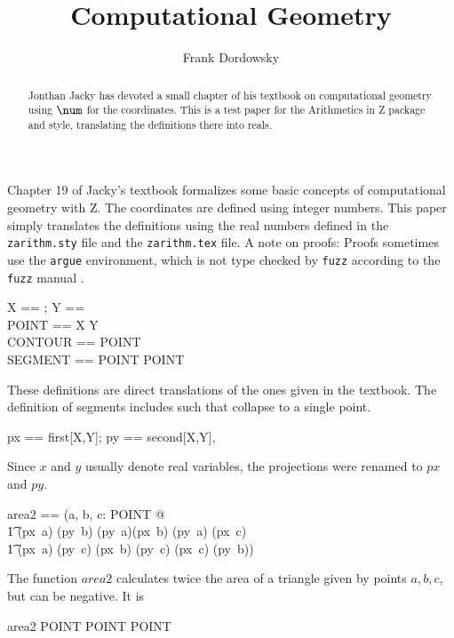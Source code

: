 \documentclass[12pt]{scrartcl}
\begin{document}
\title{Computational Geometry}
\author{Frank Dordowsky}

\maketitle

\begin{abstract}
  Jonthan Jacky has devoted a small chapter of his textbook
  \cite{Jacky1997a} on computational geometry using $\num$ for the
  coordinates. This is a test paper for the Arithmetics in Z package
  and style, translating the definitions there into reals.
\end{abstract}


Chapter 19 of Jacky's textbook \cite{Jacky1997a} formalizes some basic
concepts of computational geometry with Z. The  coordinates are
defined using integer numbers. This paper simply translates the
definitions using the real numbers defined in the \texttt{zarithm.sty}
file and the \texttt{zarithm.tex} file.
%
A note on proofs: Proofs sometimes use the \texttt{argue} environment,
which is not type checked by \texttt{fuzz} according to the
\texttt{fuzz} manual \cite{Spivey2000}.
%
\begin{zed}
  X == \real; Y == \real \\
  POINT == X \cross Y \\
  CONTOUR == \seq POINT \\
  SEGMENT == POINT \cross POINT \\
\end{zed}
%
These definitions are direct translations of the ones given in the
textbook. The definition of segments includes such that collapse to a
single point.
%
\begin{zed}
  px == first[X,Y]; py == second[X,Y], 
\end{zed}
%
Since $x$ and $y$ usually denote real variables, the projections were
renamed to $px$ and $py$.
%
\begin{zed}
  area2 == (\lambda a, b, c: POINT @ \\
  \t1 (px~a) \amult (py~b) \aminus (py~a)\amult (px~b) \aplus (py~a)\amult
  (px~c) \\
  \t1 \aminus (px~a) \amult (py~c) \aplus (px~b) \amult (py~c) \aminus
  (px~c) \amult (py~b))
\end{zed}
%
The function $area2$ calculates twice the area of a triangle given by
points $a,b,c$, but can be negative. It is
%
\begin{zed}
  area2 \in POINT \cross POINT \cross POINT \fun \real
\end{zed}
\end{document}

